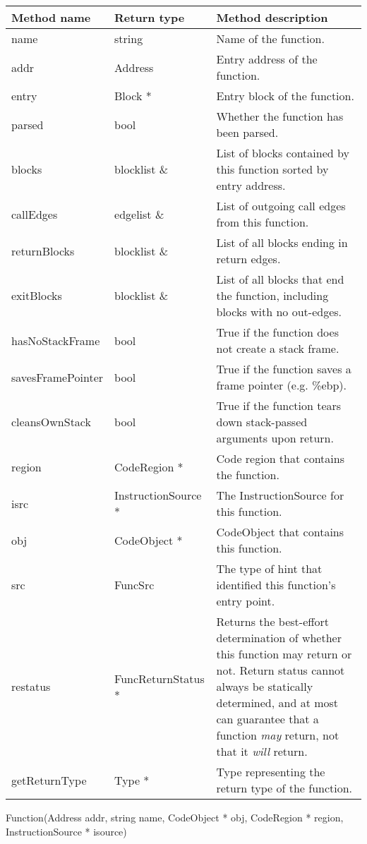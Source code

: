 \begin{tabular}{p{1.25in}p{1.125in}p{3.125in}}
\toprule
Method name & Return type & Method description \\
\midrule
name & string & Name of the function. \\
addr & Address & Entry address of the function.  \\
entry & Block * & Entry block of the function. \\
parsed & bool & Whether the function has been parsed. \\
blocks & blocklist \& & List of blocks contained by this function sorted by entry address. \\
callEdges & edgelist \& & List of outgoing call edges from this function. \\
returnBlocks & blocklist \& & List of all blocks ending in return edges. \\
exitBlocks & blocklist \& & List of all blocks that end the function, including blocks with no out-edges. \\
hasNoStackFrame & bool & True if the function does not create a stack frame. \\
savesFramePointer & bool & True if the function saves a frame pointer (e.g. \%ebp). \\
cleansOwnStack & bool & True if the function tears down stack-passed arguments upon return. \\
region & CodeRegion * & Code region that contains the function. \\
isrc & InstructionSource * & The InstructionSource for this function. \\
obj & CodeObject * & CodeObject that contains this function. \\
src & FuncSrc & The type of hint that identified this function's entry point. \\
restatus & FuncReturnStatus * & Returns the best-effort determination of whether this function may return or not. Return status cannot always be statically determined, and at most can guarantee that a function \emph{may} return, not that it \emph{will} return. \\
getReturnType & Type * & Type representing the return type of the function. \\

\bottomrule
\end{tabular}

\begin{apient}
Function(Address addr,
         string name,
         CodeObject * obj,
         CodeRegion * region,
         InstructionSource * isource)
\end{apient}

